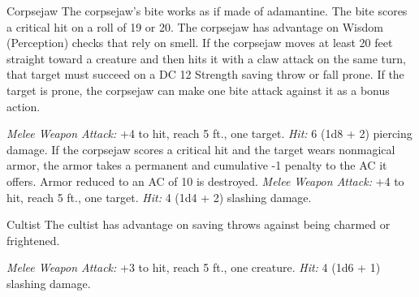 \documentclass[10pt,a4paper,twoside,twocolumn,openany,bg=print,nodeprecatedcode]{dndbook}
\begin{document}
\clearpage

\begin{DndMonster}[float*=t]{Corpsejaw}
\DndMonsterBasics[
armor-class = {12},
hit-points = {\DndDice{4d8}},
speed = {40 ft.}
]
\DndMonsterAbilityScores[
 str = 15,
 dex = 14,
 con = 10,
 int = 3,
 wis = 13,
 cha = 7
]
\DndMonsterDetails[
senses = {darkvision 60 ft., passive perception 11},
challenge = 1/4,
]
The corpsejaw's bite works as if made of adamantine. The bite scores a critical hit on a roll of 19 or 20.
The corpsejaw has advantage on Wisdom (Perception) checks that rely on smell.
If the corpsejaw moves at least 20 feet straight toward a creature and then hits it with a claw attack on the same turn, that target must succeed on a DC 12 Strength saving throw or fall prone. If the target is prone, the corpsejaw can make one bite attack against it as a bonus action.
\par
{}
\textsl{Melee Weapon Attack:} +4 to hit, reach 5 ft., one target. \textsl{Hit:} 6 (1d8 + 2) piercing damage. If the corpsejaw scores a critical hit and the target wears nonmagical armor, the armor takes a permanent and cumulative -1 penalty to the AC it offers. Armor reduced to an AC of 10 is destroyed.
\textsl{Melee Weapon Attack:} +4 to hit, reach 5 ft., one target. \textsl{Hit:} 4 (1d4 + 2) slashing damage.
\end{DndMonster}



\begin{DndMonster}[float*=t]{Cultist}
\DndMonsterBasics[
armor-class = {12 (leather armor)},
hit-points = {\DndDice{2d8}},
speed = {30 ft.}
]
\DndMonsterAbilityScores[
 str = 11,
 dex = 12,
 con = 10,
 int = 10,
 wis = 11,
 cha = 10
]
\DndMonsterDetails[
skills = {Deception +2, Religion +2},
languages = {any one language (usually Common)},
challenge = 1/8,
]
The cultist has advantage on saving throws against being charmed or frightened.
\par
{}
\textsl{Melee Weapon Attack:} +3 to hit, reach 5 ft., one creature. \textsl{Hit:} 4 (1d6 + 1) slashing damage.
\end{DndMonster}
\end{document}
